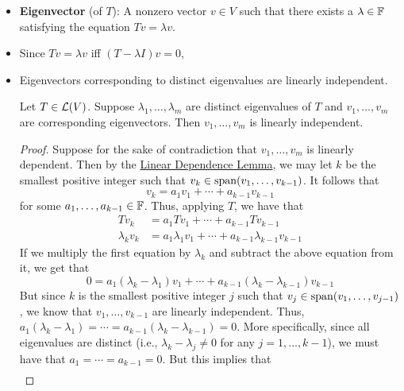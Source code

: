\documentclass[../main.tex]{subfiles}
\begin{document}
\begin{itemize}
\begin{theorem}
    \end{theorem}
    \item \textbf{Eigenvector} (of $T$): A nonzero vector $v\in V$ such that there exists a $\lambda\in\mathbb{F}$ satisfying the equation $Tv=\lambda v$.
    \item Since $Tv=\lambda v$ iff $(T-\lambda I)v=0$, 
    \item Eigenvectors corresponding to distinct eigenvalues are linearly independent.
    \begin{theorem}\label{trm:lnlIndependentEigenvectors}
        Let $T\in\mathcal{L}(V)$. Suppose $\lambda_1,\dots,\lambda_m$ are distinct eigenvalues of $T$ and $v_1,\dots,v_m$ are corresponding eigenvectors. Then $v_1,\dots,v_m$ is linearly independent.
        \begin{proof}
            Suppose for the sake of contradiction that $v_1,\dots,v_m$ is linearly dependent. Then by the \hyperref[lem:linearDependenceLemma]{Linear Dependence Lemma}, we may let $k$ be the smallest positive integer such that $v_k\in\operatorname{span}(v_1,\dots,v_{k-1})$. It follows that
            \begin{equation*}
                v_k = a_1v_1+\cdots+a_{k-1}v_{k-1}
            \end{equation*}
            for some $a_1,\dots,a_{k-1}\in\mathbb{F}$. Thus, applying $T$, we have that
            \begin{align*}
                Tv_k &= a_1Tv_1+\cdots+a_{k-1}Tv_{k-1}\\
                \lambda_kv_k &= a_1\lambda_1v_1+\cdots+a_{k-1}\lambda_{k-1}v_{k-1}
            \end{align*}
            If we multiply the first equation by $\lambda_k$ and subtract the above equation from it, we get that
            \begin{equation*}
                0 = a_1(\lambda_k-\lambda_1)v_1+\cdots+a_{k-1}(\lambda_k-\lambda_{k-1})v_{k-1}
            \end{equation*}
            But since $k$ is the smallest positive integer $j$ such that $v_j\in\operatorname{span}(v_1,\dots,v_{j-1})$, we know that $v_1,\dots,v_{k-1}$ are linearly independent. Thus, $a_1(\lambda_k-\lambda_1)=\cdots=a_{k-1}(\lambda_k-\lambda_{k-1})=0$. More specifically, since all eigenvalues are distinct (i.e., $\lambda_k-\lambda_j\neq 0$ for any $j=1,\dots,k-1$), we must have that $a_1=\cdots=a_{k-1}=0$. But this implies that
            \begin{align*}

\end{align*}
\end{proof}
\end{theorem}
\end{itemize}
\end{document}
